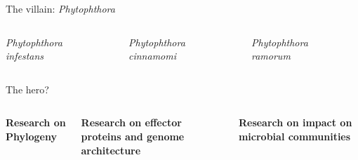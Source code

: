\documentclass[aspectratio=169]{beamer}
\begin{document}
\begin{frame}{The villain: \textit{Phytophthora}}
    \begin{columns}
        \begin{column}{0.3\textwidth}
            \centering
            \textit{Phytophthora\\infestans}
        \end{column}
        \begin{column}{0.3\textwidth}
            \centering
            \textit{Phytophthora\\cinnamomi}
        \end{column}
        \begin{column}{0.3\textwidth}
            \centering
            \textit{Phytophthora\\ramorum}
        \end{column}
    \end{columns}
\end{frame}

\begin{frame}{The hero?}
    \begin{columns}
        \begin{column}{0.3\textwidth}
            \centering
            \textbf{Research on Phylogeny}\footnotemark{}\footnotemark{}
        \end{column}
        \begin{column}{0.3\textwidth}
            \centering
            \textbf{Research on effector proteins\footnotemark{} and genome
            architecture\footnotemark{}}
        \end{column}
        \begin{column}{0.3\textwidth}
            \centering
            \textbf{Research on impact on microbial communities\footnotemark}
        \end{column}
    \end{columns}
\end{frame}
\end{document}
